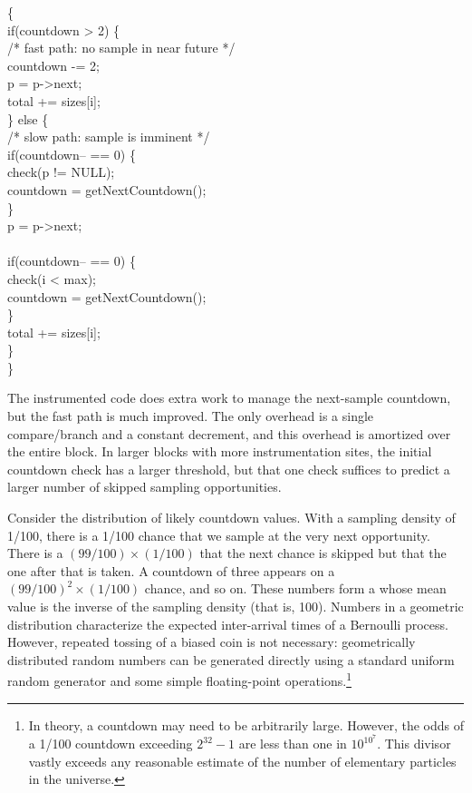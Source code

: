 \begin{code}
  \{\+ \\
  if(countdown > 2) \{ \\
  \> /* fast path: no sample in near future */ \\
  \> countdown -= 2; \\
  \> \up p = p->next; \\
  \> \up total += sizes[i]; \\
  \} else \{ \\
  \> /* slow path: sample is imminent */ \\
  \> if(countdown-- == 0) \{ \\
  \>\> check(p != NULL); \\
  \>\> countdown = getNextCountdown(); \\
  \> \} \\
  \> \up p = p->next; \\
  \> \\
  \> if(countdown-- == 0) \{ \\
  \>\> check(i < max); \\
  \>\> countdown = getNextCountdown(); \\
  \> \} \\
  \> \up total += sizes[i]; \\
  \} \\
  \<\}
\end{code}

The instrumented code does extra work to manage the
next-sample countdown, but the fast path is much improved.  The only
overhead is a single compare/branch and a constant decrement, and this
overhead is amortized over the entire block.  In larger blocks with
more instrumentation sites, the initial countdown check has a larger
threshold, but that one check suffices to predict a larger number of
skipped sampling opportunities.

Consider the distribution of likely countdown values.  With a sampling
density of 1/100, there is a 1/100 chance that we sample at the very
next opportunity.  There is a $(99/100) \times (1/100)$ that the next
chance is skipped but that the one after that is taken.  A countdown
of three appears on a $(99/100)^2 \times (1/100)$ chance, and so on.  These
numbers form a  whose mean value is
the inverse of the sampling density (that is, 100).  Numbers in a
geometric distribution characterize the expected inter-arrival times
of a Bernoulli process.  However, repeated tossing of a biased coin is
not necessary: geometrically distributed random numbers can be
generated directly using a standard uniform random generator and some
simple floating-point operations.\footnote{In theory, a countdown may
  need to be arbitrarily large.  However, the odds of a 1/100
  countdown exceeding $2^{32}-1$ are less than one in $10^{10^7}$.
  This divisor vastly exceeds any reasonable estimate of the number of
  elementary particles in the universe.}

